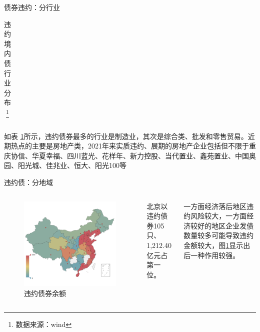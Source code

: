\begin{frame}{债券违约：分行业}
\begin{table}[]
{\begin{tabular}{llllll}
			\end{tabular}
		}
		\caption{违约境内债行业分布\footnote{数据来源：wind}}
		\label{fig:default_indus}
	\end{table}
	如表 \ref{fig:default_indus}所示，违约债券最多的行业是制造业，其次是综合类、批发和零售贸易。近期热点的主要是房地产类，2021年来实质违约、展期的房地产企业包括但不限于重庆协信、华夏幸福、四川蓝光、花样年、新力控股、当代置业、鑫苑置业、中国奥园、阳光城、佳兆业、恒大、阳光100等
\end{frame}

\begin{frame}{违约债：分地域}
	\begin{columns}
		\begin{figure}
			\centering
			\includegraphics[width=\linewidth]{lib/default_by_geo.png}
			\caption{违约债券余额}
			\label{fig:defaultGeo}
		\end{figure}
		北京以违约债券105只、1,212.40亿元占第一位。

		一方面经济落后地区违约风险较大，一方面经济较好的地区企业发债数量较多可能导致违约金额较大，图\ref{fig:defaultGeo}显示出后一种作用较强。
	\end{columns}
\end{frame}
